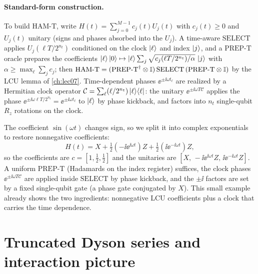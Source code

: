 \paragraph{Standard-form construction.}
To build $\mathrm{HAM\text{-}T}$, write $H(t)=\sum_{j=0}^{M-1}c_j(t)U_j(t)$ with
$c_j(t)\ge0$ and $U_j(t)$ unitary (signs and phases absorbed into the $U_j$). A time-aware
$\mathrm{SELECT}$ applies $U_j(\ell T/2^{n_t})$ conditioned on the clock $\ket\ell$ and
index $\ket j$, and a $\mathrm{PREP\text{-}T}$ oracle prepares the coefficients
$\ket\ell\ket{0}\mapsto\ket\ell\sum_j\sqrt{c_j(\ell T/2^{n_t})/\alpha}\,\ket j$ with
$\alpha\ge\max_\ell\sum_j c_j$; then
$\mathrm{HAM\text{-}T}=(\mathrm{PREP\text{-}T}^{\dagger}\otimes\mathbb{I})\,\mathrm{SELECT}\,
(\mathrm{PREP\text{-}T}\otimes\mathbb{I})$ by the LCU lemma of \cref{ch:lec07}. Time-dependent
phases $\ee^{\pm\ii\omega t_\ell}$ are realized by a Hermitian clock operator
$\mathcal C=\sum_\ell(\ell/2^{n_t})\ket{\ell}\!\bra{\ell}$: the unitary $\ee^{\pm\ii\omega T\mathcal C}$
applies the phase $\ee^{\pm\ii\omega\ell T/2^{n_t}}=\ee^{\pm\ii\omega t_\ell}$ to
$\ket\ell$ by phase kickback, and factors into $n_t$ single-qubit $R_z$ rotations on the
clock.

\begin{example}[{Clock encoding of $H(t)=X+\sin(\omega t)Z$}]
\label{exa:lec12-clock}
The coefficient $\sin(\omega t)$ changes sign, so we split it into complex exponentials to
restore nonnegative coefficients:
\begin{equation}
  H(t)=X+\tfrac12(-\ii\ee^{\ii\omega t})Z+\tfrac12(\ii\ee^{-\ii\omega t})Z,
  \label{eq:lec12-clock-standard}
\end{equation}
so the coefficients are $c=[1,\tfrac12,\tfrac12]$ and the unitaries are
$[X,\,-\ii\ee^{\ii\omega t}Z,\,\ii\ee^{-\ii\omega t}Z]$. A uniform $\mathrm{PREP\text{-}T}$
(Hadamards on the index register) suffices, the clock phases $\ee^{\pm\ii\omega T\mathcal C}$
are applied inside $\mathrm{SELECT}$ by phase kickback, and the $\pm\ii$ factors are set by
a fixed single-qubit gate (a phase gate conjugated by $X$). This small example already shows
the two ingredients: nonnegative LCU coefficients plus a clock that carries the time
dependence.
\end{example}

\section{Truncated Dyson series and interaction picture}
\label{sec:lec12-4}

